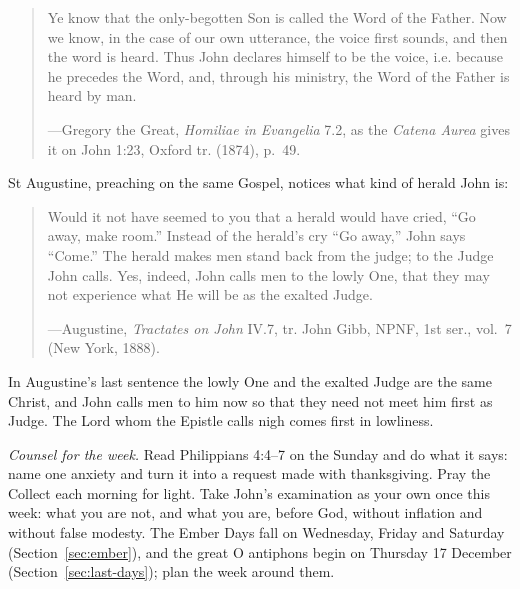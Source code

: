 \begin{quote}
Ye know that the only-begotten Son is called the Word of the Father. Now we know, in the case of
our own utterance, the voice first sounds, and then the word is heard. Thus John declares himself
to be the voice, i.e. because he precedes the Word, and, through his ministry, the Word of the
Father is heard by man.\par
{\smallskip\noindent\small ---Gregory the Great, \textit{Homiliae in Evangelia} 7.2, as the
\textit{Catena Aurea} gives it on John 1:23, Oxford tr. (1874), p.~49.\par}
\end{quote}

St Augustine, preaching on the same Gospel, notices what kind of herald John is:

\begin{quote}
Would it not have seemed to you that a herald would have cried, ``Go away, make room.'' Instead
of the herald's cry ``Go away,'' John says ``Come.'' The herald makes men stand back from the
judge; to the Judge John calls. Yes, indeed, John calls men to the lowly One, that they may not
experience what He will be as the exalted Judge.\par
{\smallskip\noindent\small ---Augustine, \textit{Tractates on John} IV.7, tr. John Gibb, NPNF,
1st ser., vol.~7 (New York, 1888).\par}
\end{quote}

In Augustine's last sentence the lowly One and the exalted Judge are the same Christ, and John
calls men to him now so that they need not meet him first as Judge. The Lord whom the Epistle
calls nigh comes first in lowliness.

\medskip
\noindent\textit{Counsel for the week.} Read Philippians 4:4--7 on the Sunday and do what it
says: name one anxiety and turn it into a request made with thanksgiving. Pray the Collect
 each morning for light. Take John's examination as your own once this week:
what you are not, and what you are, before God, without inflation and without false modesty. The
Ember Days fall on Wednesday, Friday and Saturday (Section~\ref{sec:ember}), and the great O
antiphons begin on Thursday 17 December (Section~\ref{sec:last-days}); plan the week around them.
